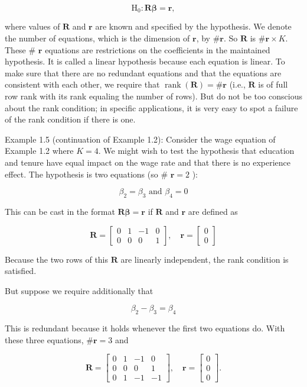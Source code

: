 \documentclass[10pt]{article}
\begin{document}
\begin{equation*}
\mathrm{H}_{0}: \mathbf{R} \boldsymbol{\beta}=\mathbf{r}, \tag{1.4.8}
\end{equation*}


where values of $\mathbf{R}$ and $\mathbf{r}$ are known and specified by the hypothesis. We denote the number of equations, which is the dimension of $\mathbf{r}$, by $\# \mathbf{r}$. So $\mathbf{R}$ is $\# \mathbf{r} \times K$. These \# $\mathbf{r}$ equations are restrictions on the coefficients in the maintained hypothesis. It is called a linear hypothesis because each equation is linear. To make sure that there are no redundant equations and that the equations are consistent with each other, we require that $\operatorname{rank}(\mathbf{R})=\# \mathbf{r}$ (i.e., $\mathbf{R}$ is of full row rank with its rank equaling the number of rows). But do not be too conscious about the rank condition; in specific applications, it is very easy to spot a failure of the rank condition if there is one.

Example 1.5 (continuation of Example 1.2): Consider the wage equation of Example 1.2 where $K=4$. We might wish to test the hypothesis that education and tenure have equal impact on the wage rate and that there is no experience effect. The hypothesis is two equations (so \# $\mathbf{r}=2$ ):

$$
\beta_{2}=\beta_{3} \text { and } \beta_{4}=0
$$

This can be cast in the format $\mathbf{R} \boldsymbol{\beta}=\mathbf{r}$ if $\mathbf{R}$ and $\mathbf{r}$ are defined as

$$
\mathbf{R}=\left[\begin{array}{cccc}
0 & 1 & -1 & 0 \\
0 & 0 & 0 & 1
\end{array}\right], \quad \mathbf{r}=\left[\begin{array}{l}
0 \\
0
\end{array}\right]
$$

Because the two rows of this $\mathbf{R}$ are linearly independent, the rank condition is satisfied.

But suppose we require additionally that

$$
\beta_{2}-\beta_{3}=\beta_{4}
$$

This is redundant because it holds whenever the first two equations do. With these three equations, $\# \mathbf{r}=3$ and

$$
\mathbf{R}=\left[\begin{array}{cccc}
0 & 1 & -1 & 0 \\
0 & 0 & 0 & 1 \\
0 & 1 & -1 & -1
\end{array}\right], \quad \mathbf{r}=\left[\begin{array}{l}
0 \\
0 \\
0
\end{array}\right] .
$$
\end{document}
